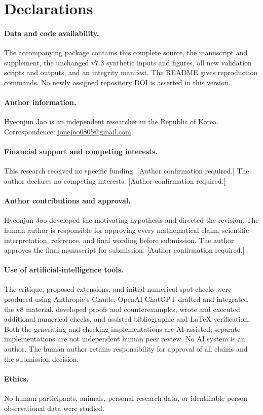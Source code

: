 \section*{Declarations}
\paragraph{Data and code availability.}
The accompanying package contains this complete source, the manuscript and
supplement, the unchanged v7.3 synthetic inputs and figures, all new validation
scripts and outputs, and an integrity manifest. The README gives reproduction
commands. No newly assigned repository DOI is asserted in this version.
\paragraph{Author information.}
Hyeonjun Joo is an independent researcher in the Republic of Korea.
Correspondence: \href{mailto:jonejoo0805@gmail.com}{jonejoo0805@gmail.com}.
\paragraph{Financial support and competing interests.}
This research received no specific funding.
\textup{[Author confirmation required.]} %
The author declares no competing interests.
\textup{[Author confirmation required.]} %
\paragraph{Author contributions and approval.}
Hyeonjun Joo developed the motivating hypothesis and directed the revision.
The human author is responsible for approving every mathematical claim,
scientific interpretation, reference, and final wording before submission.
The author approves the final manuscript for submission.
\textup{[Author confirmation required.]} %
\paragraph{Use of artificial-intelligence tools.}
The critique, proposed extensions, and initial numerical spot checks were
produced using Anthropic's Claude. OpenAI ChatGPT drafted and integrated the v8 material, developed
proofs and counterexamples, wrote and executed additional numerical checks,
and assisted bibliographic and LaTeX verification. Both the generating and checking implementations
are AI-assisted; separate implementations are not independent human peer
review. No AI system is an author. The human author retains responsibility
for approval of all claims and the submission decision.
\paragraph{Ethics.}
No human participants, animals, personal research data, or identifiable-person
observational data were studied.

